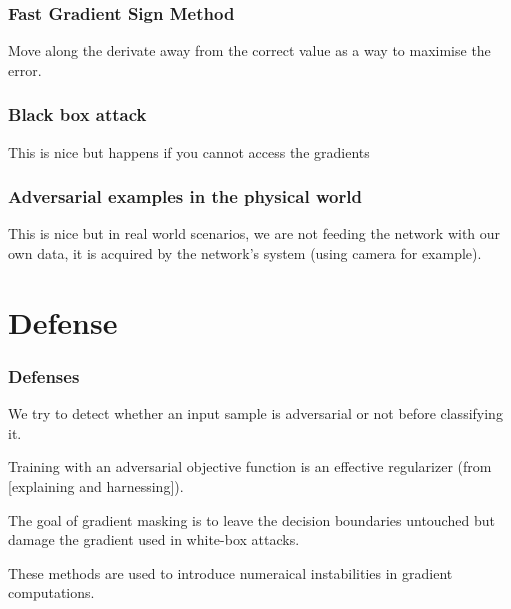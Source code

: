 \documentclass[9pt]{beamer}
\begin{document}
\begin{frame}
  \frametitle{Fast Gradient Sign Method}

  Move along the derivate away from the correct value as a way to
  maximise the error.
\end{frame}

\begin{frame}
  \frametitle{Black box attack}

  This is nice but happens if you cannot access the gradients

\end{frame}

\begin{frame}
  \frametitle{Adversarial examples in the physical world}

  This is nice but in real world scenarios, we are not feeding the
  network with our own data, it is acquired by the network's system
  (using camera for example).

\end{frame}

\section{Defense}

\begin{frame}
  \frametitle{Defenses}

  \begin{description}
  \item[Adversarial sample detection] We try to detect whether an
    input sample is adversarial or not before classifying it.
  \item Training with an adversarial objective function is an
    effective regularizer (from [explaining and harnessing]).
  \item[Gradient masking] The goal of gradient masking is to leave the
    decision boundaries untouched but damage the gradient used in
    white-box attacks.
  \item[Distillation and network saturation] These methods are used to
    introduce numeraical instabilities in gradient computations.
  \end{description}
\end{frame}
\end{document}
